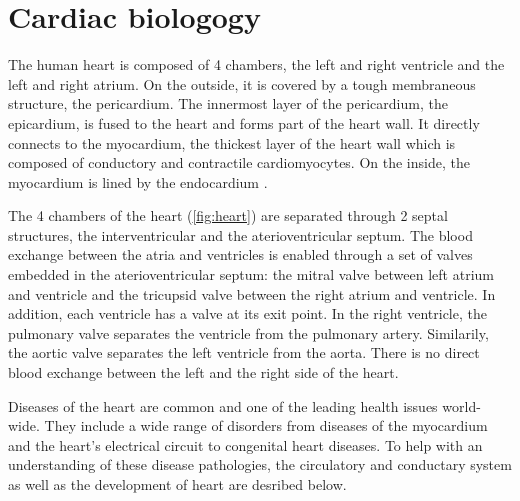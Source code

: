 \section{Cardiac biologogy}

The human heart is composed of \num{4} chambers, the left and right ventricle and the left and right atrium. On the outside, it is covered by a tough membraneous structure, the pericardium. The innermost layer of the  pericardium, the epicardium, is fused to the heart and forms part of the heart wall. It directly connects to the myocardium, the thickest layer of the heart wall which is composed of conductory and contractile cardiomyocytes. On the inside, the myocardium is lined by the endocardium \citep{Betts2013}.  

The \num{4} chambers of the heart (\cref{fig:heart}) are separated through \num{2} septal structures, the interventricular and the aterioventricular septum. The blood exchange between the atria and ventricles is enabled through a set of valves embedded in the aterioventricular septum: the mitral valve between left atrium and ventricle and the tricupsid valve between the right atrium and ventricle. In addition, each ventricle has a valve at its exit point. In the right ventricle, the pulmonary valve separates the ventricle from the pulmonary artery. Similarily, the aortic valve separates the left ventricle from the aorta. There is no direct blood exchange between the left and the right side of the heart. 

Diseases of the heart are common and one of the leading health issues world-wide. They include a wide range of disorders from diseases of the myocardium and the heart’s electrical circuit to congenital heart diseases. To help with an understanding of these disease pathologies, the circulatory and conductary system as well as the development of heart are desribed below. 

